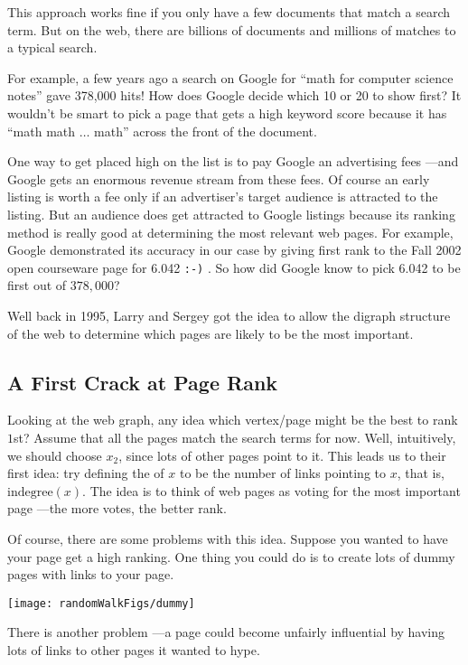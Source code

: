 This approach works fine if you only have a few documents that match a
search term.  But on the web, there are billions of documents and millions
of matches to a typical search.

For example, a few years ago a search on Google for ``math for computer
science notes'' gave 378,000 hits!  How does Google decide which 10 or 20
to show first?  It wouldn't be smart to pick a page that gets a high
keyword score because it has ``math math $\dots$ math'' across the front
of the document.

One way to get placed high on the list is to pay Google an advertising
fees ---and Google gets an enormous revenue stream from these fees.  Of
course an early listing is worth a fee only if an advertiser's target
audience is attracted to the listing.  But an audience does get attracted
to Google listings because its ranking method is really good at
determining the most relevant web pages.  For example, Google demonstrated
its accuracy in our case by giving first rank to the Fall 2002 open
courseware page for 6.042 \texttt{:-)} .  So how did Google know to pick
6.042 to be first out of $378,000$?

Well back in 1995, Larry and Sergey got the idea to allow the digraph
structure of the web to determine which pages are likely to be the most
important.

\subsection{A First Crack at Page Rank}

Looking at the web graph, any idea which vertex/page might be the best to
rank $1$st?  Assume that all the pages match the search terms for now.
Well, intuitively, we should choose $x_2$, since lots of other pages point
to it.  This leads us to their first idea: try defining the  of $x$ to be the number of links pointing to $x$, that is,
$\text{indegree}(x)$.  The idea is to think of web pages as voting for the
most important page ---the more votes, the better rank.

Of course, there are some problems with this idea.  Suppose you wanted
to have your page get a high ranking.  One thing you could do is to
create lots of dummy pages with links to your page.

\texttt{[image: randomWalkFigs/dummy]}

There is another problem ---a page could become unfairly influential by
having lots of links to other pages it wanted to hype.

